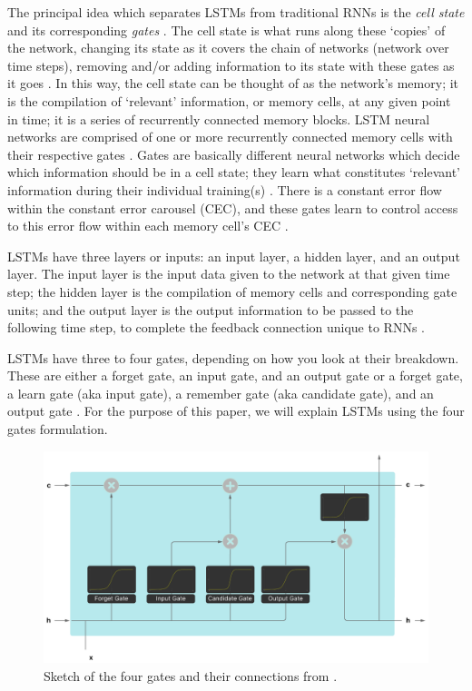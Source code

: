\documentclass[10pt,twocolumn]{article}
\begin{document}
The principal idea which separates LSTMs from traditional RNNs is the \emph{cell state} and its corresponding \emph{gates} \cite{UnderstandingLSTMs}. The cell state is what runs along these `copies' of the network, changing its state as it covers the chain of networks (network over time steps), removing and/or adding information to its state with these gates as it goes \cite{IllustratedGuideToLSTMs}. In this way, the cell state can be thought of as the network's memory; it is the compilation of `relevant' information, or memory cells, at any given point in time; it is a series of recurrently connected memory blocks. LSTM neural networks are comprised of one or more recurrently connected memory cells with their respective gates \cite{GentleIntroductionToLSTMNetworks}. Gates are basically different neural networks which decide which information should be in a cell state; they learn what constitutes `relevant' information during their individual training(s) \cite{IllustratedGuideToLSTMs}. There is a constant error flow within the constant error carousel (CEC), and these gates learn to control access to this error flow within each memory cell's CEC \cite{GentleIntroductionToLSTMNetworks}.

LSTMs have three layers or inputs: an input layer, a hidden layer, and an output layer. The input layer is the input data given to the network at that given time step; the hidden layer is the compilation of memory cells and corresponding gate units; and the output layer is the output information to be passed to the following time step, to complete the feedback connection unique to RNNs \cite{IllustratedGuideToLSTMs}.

LSTMs have three to four gates, depending on how you look at their breakdown. These are either a forget gate, an input gate, and an output gate \cite{GentleIntroductionToLSTMNetworks} or a forget gate, a learn gate (aka input gate), a remember gate (aka candidate gate), and an output gate \cite{HowLSTMsWork}. For the purpose of this paper, we will explain LSTMs using the four gates formulation.

\begin{figure}
    \centering
    \includegraphics[scale=0.15]{images/four_layers.png}
    \caption{
        Sketch of the four gates and their connections from \cite{LSTMMemoryLayers}.
    }
\end{figure}
\end{document}
